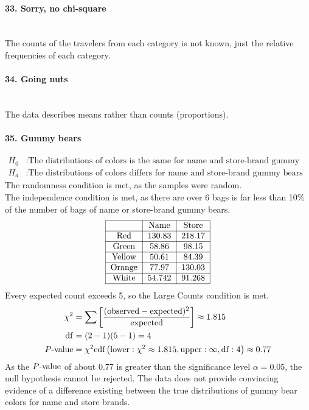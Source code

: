 \documentclass[../Homework]{subfiles}
\begin{document}
		\paragraph{33. Sorry, no chi-square}\ \\
			The counts of the travelers from each category is not known, just the relative frequencies of each category.
		\paragraph{34. Going nuts}\ \\
			The data describes means rather than counts (proportions).
		\paragraph{35. Gummy bears}
			\begin{align*}
				H_0&: \text{The distributions of colors is the same for name and store-brand gummy bears} \\
				H_a&: \text{The distributions of colors differs for name and store-brand gummy bears}
			\end{align*}
			The randomness condition is met, as the samples were random. \\
			The independence condition is met, as there are over 6 bags is far less than 10\% of the number of bags of name or store-brand gummy bears. \\
			\[\begin{tabular}{|c|c|c|}\hline
				& Name & Store \\\hline
				Red & 130.83 & 218.17 \\\hline
				Green & 58.86 & 98.15 \\\hline
				Yellow & 50.61 & 84.39 \\\hline
				Orange & 77.97 & 130.03 \\\hline
				White & 54.742 & 91.268 \\\hline
			\end{tabular}\]
			Every expected count exceeds 5, so the Large Counts condition is met.
			\begin{align*}
				\chi^2 &= \sum\left[\mathrm{\frac{(observed - expected)^2}{expected}}\right] \approx 1.815 \\
				\operatorname{df} &= (2 - 1)(5 - 1) = 4 \\
				P\text{-value} &= \chi^2\text{cdf}\left(\operatorname{lower}: \chi^2 \approx 1.815, \operatorname{upper}: \infty, \operatorname{df}: 4\right) \approx 0.77
			\end{align*}
			As the $P\text{-value}$ of about 0.77 is greater than the significance level $\alpha = 0.05$, the null hypothesis cannot be rejected. The data does not provide convincing evidence of a difference existing between the true distributions of gummy bear colors for name and store brands.
\end{document}
